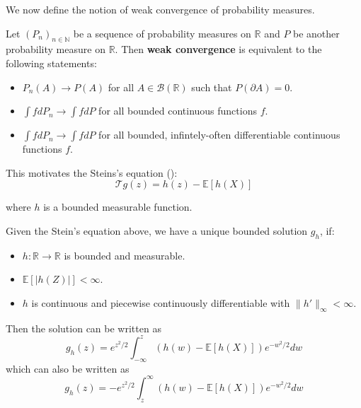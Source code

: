 \documentclass{article}
\begin{document}
We now define the notion of weak convergence of probability measures.  

\begin{definition}
   Let $(P_n)_{n\in \mathbb{N}}$ be a sequence of probability measures on $\mathbb{R}$ and $P$ be another probability measure on $\mathbb{R}$. Then \textbf{weak convergence} is equivalent to the following statements:
   \begin{itemize}
    \item $P_n(A) \to P(A)$ for all $A \in \mathcal{B}(\mathbb{R})$ such that $P(\partial A)=0$.
    \item $\int f dP_n \to \int f dP$ for all bounded continuous functions $f$.
    \item $\int f dP_n \to \int f dP$ for all bounded, infintely-often differentiable continuous functions $f$.
   \end{itemize}
\end{definition}

This motivates the Steins's equation ():
\begin{equation}\label{eq:stein_equation_normal}
    \mathcal{T}g(z) = h(z) - \mathbb{E}[h(X)]
\end{equation}

where $h$ is a bounded measurable function.


\begin{lemma}\label{lem:stein_equation_normal}
    Given the Stein's equation above, we have a unique bounded solution $g_h$, if:
    \begin{itemize}
        \item $h:\mathbb{R} \to \mathbb{R}$ is bounded and measurable.
        \item $\mathbb{E}[|h(Z)|] < \infty$.
        \item $h$ is continuous and piecewise continuously differentiable with $\|h'\|_\infty < \infty$.
    \end{itemize}

        Then the solution can be written as
        \begin{equation*}
            g_h(z) = e^{z^2/2} \int_{-\infty}^z (h(w) - \mathbb{E}[h(X)]) e^{-w^2/2} dw
        \end{equation*}
        which can also be written as
        \begin{equation*}
            g_h(z) = -e^{z^2/2} \int_{z}^\infty (h(w) - \mathbb{E}[h(X)]) e^{-w^2/2} dw
        \end{equation*}
    \end{lemma}
\end{document}
